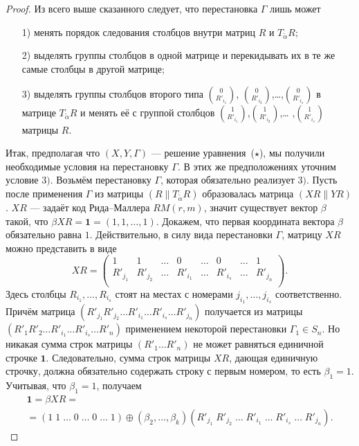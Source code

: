 \begin{proof}
Из всего выше сказанного следует, что перестановка $\Gamma$ лишь
может
\begin{itemize}
\item[1)] менять порядок следования столбцов внутри матриц $R$ и
$T_{\widetilde\alpha}R$; \item[2)] выделять группы столбцов в
одной матрице и перекидывать их в те же самые столбцы в другой
матрице; \item[3)] выделять группы столбцов второго типа
$\binom{0}{R'_{i_1}}$,
$\binom{0}{R'_{i_2}}$,\ldots,$\binom{0}{R'_{i_s}}$ в матрице
$T_{\widetilde\alpha}R$ и менять её с группой столбцов
$\binom{1}{R'_{i_1}}$,$\binom{1}{R'_{i_2}}$,\ldots
,$\binom{1}{R'_{i_s}}$ матрицы $R$.
\end{itemize}
Итак, предполагая что $(X,Y,\Gamma)$ --- решение
уравнения~($\star$), мы получили необходимые условия на
перестановку $\Gamma$. В этих же предположениях уточним условие
$3)$. Возьмём перестановку $\Gamma$, которая обязательно реализует
$3)$. Пусть после применения $\Gamma$ из матрицы
$(R\|T_{\widetilde\alpha}R)$ образовалась матрица $(XR\|YR)$. $XR$
--- задаёт код Рида--Маллера $RM(r,m)$, значит существует вектор
$\beta$ такой, что $\beta XR=\mathbf 1=(1,1,\ldots,1)$. Докажем,
что первая координата вектора $\beta$ обязательно равна $1$.
Действительно, в силу вида перестановки $\Gamma$, матрицу $XR$
можно представить в виде
$$
XR=
\begin{pmatrix}
1&1&\ldots&0&\ldots&0&\ldots&1\\
R'_{j_1}&R'_{j_2}&\ldots&R'_{i_1}&\ldots&R'_{i_s}&\ldots&R'_{j_n}\\
\end{pmatrix}.
$$
Здесь столбцы $R_{i_1},\ldots,R_{i_s}$ стоят на местах с номерами
$j_{i_1},\ldots, j_{i_s}$ соответственно. Причём матрица
$(R'_{j_1}R'_{j_2}\ldots R'_{i_1}\ldots R'_{i_s}\ldots R'_{j_n})$
получается  из матрицы \\ $(R'_1 R'_2 \ldots R'_{i_1} \ldots
R'_{i_s} \ldots R'_n)$ применением некоторой перестановки
$\Gamma_1\in S_n$. Но никакая сумма строк матрицы $(R'_1\ldots
R'_n)$ не может равняться единичной строчке $\mathbf 1$.
Следовательно, сумма строк матрицы $XR$, дающая единичную строчку,
должна обязательно содержать строку с первым номером, то есть
$\beta_1=1$. Учитывая, что $\beta_1=1$, получаем
\begin{multline*}
\mathbf 1=\beta XR=\\=(1\;1\;\ldots\;0\;\ldots\;0\;\ldots\;1)\oplus
(\beta_2,\ldots,\beta_k)(R'_{j_1}\;R'_{j_2}\;\ldots\;R'_{i_1}\;\ldots\;R'_{i_s}\;\ldots\;R'_{j_n}).    

\end{multline*}
\end{proof}
